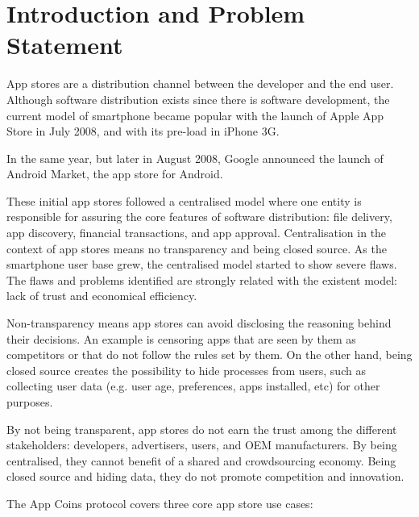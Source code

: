 
\section{Introduction and Problem Statement}
\label{sec: introduction}




App stores are a distribution channel between the developer and the end user. Although software distribution exists since there is software development, the current model of smartphone became popular with the launch of Apple App Store in July 2008, and with its pre-load in iPhone 3G.

In the same year, but later in August 2008, Google announced the launch of Android Market\cite{wiki:market}, the app store for Android.

These initial app stores followed a centralised model where one entity is responsible for assuring the core features of software distribution: file delivery, app discovery, financial transactions, and app approval. Centralisation in the context of app stores means no transparency and being closed source. As the smartphone user base grew, the centralised model started to show severe flaws. The flaws and problems identified are strongly related with the existent model: lack of trust and economical efficiency.

Non-transparency means app stores can avoid disclosing the reasoning behind their decisions. An example is censoring apps that are seen by them as competitors or that do not follow the rules set by them. On the other hand, being closed source creates the possibility to hide processes from users, such as collecting user data (e.g. user age, preferences, apps installed, etc) for other purposes.

By not being transparent, app stores do not earn the trust among the different stakeholders: developers, advertisers, users, and OEM manufacturers. By being centralised, they cannot benefit of a shared and crowdsourcing economy. Being closed source and hiding data, they do not promote competition and innovation.

The App Coins protocol covers three core app store use cases:

